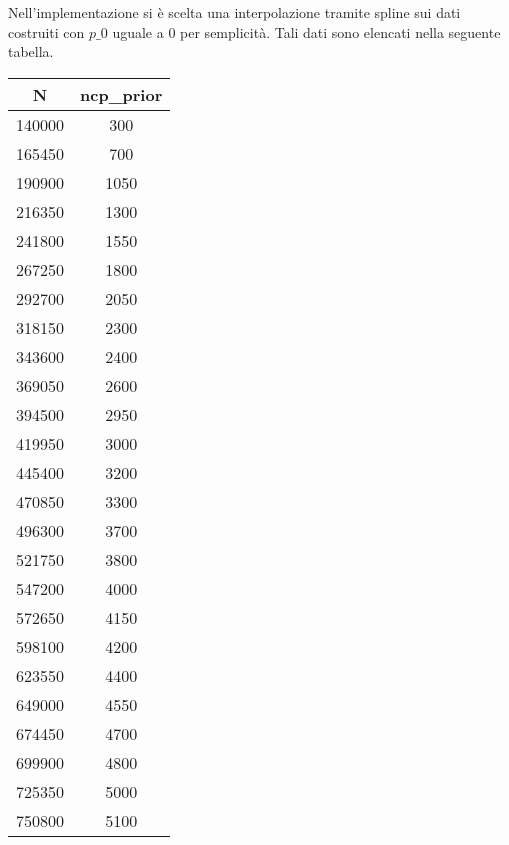 \documentclass[10pt,a4paper]{report}
\begin{document}
Nell'implementazione si è scelta una interpolazione tramite spline sui dati costruiti con $p\_0$ uguale a $0$ per semplicità. Tali dati sono elencati nella seguente tabella.

\begin{tabular}{|c|c|}
\hline
N & ncp\_prior \\
\hline
140000 & 300 \\
\hline
165450 & 700 \\
\hline
190900 & 1050 \\
\hline
216350 & 1300 \\
\hline
241800 & 1550 \\
\hline
267250 & 1800 \\
\hline
292700 & 2050 \\
\hline
318150 & 2300 \\
\hline
343600 & 2400 \\
\hline
369050 & 2600 \\
\hline
394500 & 2950 \\
\hline
419950 & 3000 \\
\hline
445400 & 3200 \\
\hline
470850 & 3300 \\
\hline
496300 & 3700 \\
\hline
521750 & 3800 \\
\hline
547200 & 4000 \\
\hline
572650 & 4150 \\
\hline
598100 & 4200 \\
\hline
623550 & 4400 \\
\hline
649000 & 4550 \\
\hline
674450 & 4700 \\
\hline
699900 & 4800 \\
\hline
725350 & 5000 \\
\hline
750800 & 5100 \\
\hline 
\end{tabular} 
\quad
\end{document}
